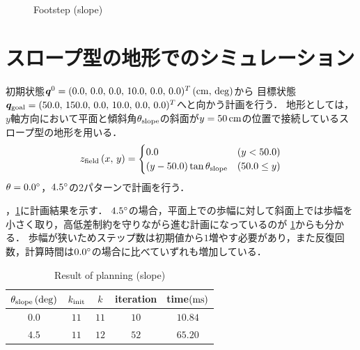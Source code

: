 \documentclass[autodetect-engine,dvipdfmx-if-dvi,ja=standard,a4j,jbase=11pt,magstyle=nomag*]{bxjsreport}
\begin{document}
\begin{figure}[pt]
\begin{subfigure}[c]{0.5\linewidth}
        \label{fig:sim_nao_slope_45_zdiff}%
    \end{subfigure}%
    \caption{Footstep (slope)}%
    \label{fig:sim_nao_slope}%
\end{figure}

\section{スロープ型の地形でのシミュレーション}
\label{sec:sim_nao_slope}
初期状態$\bm{q}^0 = ( 0.0 ,\, 0.0 ,\, 0.0 ,\, 10.0 ,\, 0.0 ,\, 0.0 )^T\,(\si{\centi\meter} ,\, \mathrm{deg})$から
目標状態$\bm{q}_{\mathrm{goal}} = ( 50.0 ,\, 150.0 ,\, 0.0 ,\, 10.0 ,\, 0.0 ,\, 0.0 )^T$へと向かう計画を行う．
地形としては，$y$軸方向において平面と傾斜角$\theta_{\mathrm{slope}}$の斜面が$y = 50\,\si{\centi\meter}$の位置で接続しているスロープ型の地形を用いる．
\begin{equation}
    z_{\mathrm{field}}\left( x ,\, y \right) =
        \begin{cases}
            0.0 & \left( y < 50.0 \right) \\
            \left( y - 50.0 \right) \tan \theta_{\mathrm{slope}} & \left( 50.0 \leq y \right)
        \end{cases}
\end{equation}
$\theta = 0.0\degree$，$4.5\degree$の2パターンで計画を行う．


，\cref{tab:sim_nao_slope}に計画結果を示す．
$4.5\degree$の場合，平面上での歩幅に対して斜面上では歩幅を小さく取り，高低差制約を守りながら進む計画になっているのが
\cref{fig:sim_nao_slope_45_zdiff}からも分かる．
歩幅が狭いためステップ数は初期値から$1$増やす必要があり，また反復回数，計算時間は$0.0\degree$の場合に比べていずれも増加している．

\begin{table}[t]%
    \caption{Result of planning (slope)}%
    \label{tab:sim_nao_slope}%
    \centering%
    \begin{tabular}{ccccc}%
        \toprule%
        $\theta_{\mathrm{slope}}\,(\mathrm{deg})$ &   $k_{\mathrm{init}}$ &   $k$     &   iteration   &   time$(\si{\milli\second})$ \\%
        \midrule%
        $0.0$                       &   $11$        &   $11$    &   $10$        &   $10.84$ \\%
        $4.5$                       &   $11$        &   $12$    &   $52$        &   $65.20$ \\%
        \bottomrule%
    \end{tabular}
\end{table}
\end{document}
